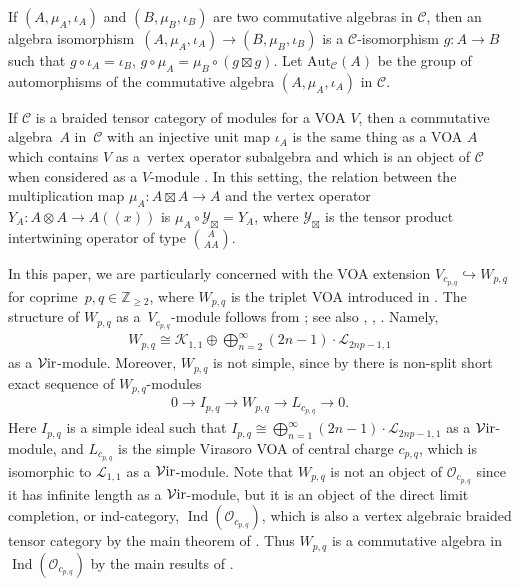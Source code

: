 \documentclass[pdftex]{sigma}
\numberwithin{equation}{section}
\theoremstyle{definition}
\begin{document}
If $(A,\mu_A,\iota_A)$ and $(B,\mu_B,\iota_B)$ are two commutative algebras in $\mathcal{C}$, then an algebra isomorphism~${(A,\mu_A,\iota_A)\rightarrow(B,\mu_B,\iota_B)}$ is a $\mathcal{C}$-isomorphism $g\colon A\rightarrow B$ such that
$
g\circ\iota_A=\iota_B$, $ g\circ\mu_A=\mu_B\circ(g\boxtimes g)$.
Let $\mathrm{Aut}_\mathcal{C}(A)$ be the group of automorphisms of the commutative algebra $(A,\mu_A,\iota_A)$ in $\mathcal{C}$.

If $\mathcal{C}$ is a braided tensor category of modules for a VOA $V$, then a commutative algebra~$A$ in~$\mathcal{C}$ with an injective unit map $\iota_A$ is the same thing as a VOA $A$ which contains $V$ as a~vertex operator subalgebra and which is an object of $\mathcal{C}$ when considered as a $V$-module \cite{HKL}. In this setting, the relation between the multiplication map $\mu_A\colon A\boxtimes A\rightarrow A$ and the vertex operator~${Y_A\colon A\otimes A\rightarrow A((x))}$ is
$
\mu_A\circ\mathcal{Y}_\boxtimes = Y_A$,
where $\mathcal{Y}_\boxtimes$ is the tensor product intertwining operator of type $\binom{A}{A A}$.

In this paper, we are particularly concerned with the VOA extension $V_{c_{p,q}}\hookrightarrow W_{p,q}$ for coprime~${p,q\in\mathbb{Z}_{\geq 2}}$, where $W_{p,q}$ is the triplet VOA introduced in \cite{FGST1-Log}. The structure of $W_{p,q}$ as a~$V_{c_{p,q}}$-module follows from \cite[Definition 4.1 and Lemma 3.5.2]{FGST1-Log}; see also \cite[Proposition 5.4]{AM-W2p-alg}, \cite[Section 4]{AM-C2-W-alg}, \cite[Proposition 4.14 and Definition 5.1]{TW2}. Namely,
\begin{gather}\label{eqn:Wpq}
W_{p,q}\cong\mathcal{K}_{1,1}\oplus\bigoplus_{n=2}^\infty (2n-1)\cdot \mathcal{L}_{2np-1,1}
\end{gather}
as a $\mathcal{V}{\rm ir}$-module. Moreover, $W_{p,q}$ is not simple, since by \cite[Theorem 5.4]{TW2} there is non-split short exact sequence of $W_{p,q}$-modules
\begin{gather}\label{eqn:Wpq-exact-seq}
0\longrightarrow I_{p,q}\longrightarrow W_{p,q}\longrightarrow L_{c_{p,q}}\longrightarrow 0.
\end{gather}
Here $I_{p,q}$ is a simple ideal such that $I_{p,q}\cong\bigoplus_{n=1}^\infty (2n-1)\cdot \mathcal{L}_{2np-1,1}$ as a $\mathcal{V}{\rm ir}$-module, and $L_{c_{p,q}}$ is the simple Virasoro VOA of central charge $c_{p,q}$, which is isomorphic to $\mathcal{L}_{1,1}$ as a $\mathcal{V}{\rm ir}$-module. Note that $W_{p,q}$ is not an object of $\mathcal{O}_{c_{p,q}}$ since it has infinite length as a $\mathcal{V}{\rm ir}$-module, but it is an object of the direct limit completion, or ind-category, $\operatorname{Ind}(\mathcal{O}_{c_{p,q}})$, which is also a vertex algebraic braided tensor category by the main theorem of \cite{CMY1}. Thus $W_{p,q}$ is a commutative algebra in~$\operatorname{Ind}(\mathcal{O}_{c_{p,q}})$ by the main results of \cite{HKL}.
\end{document}

